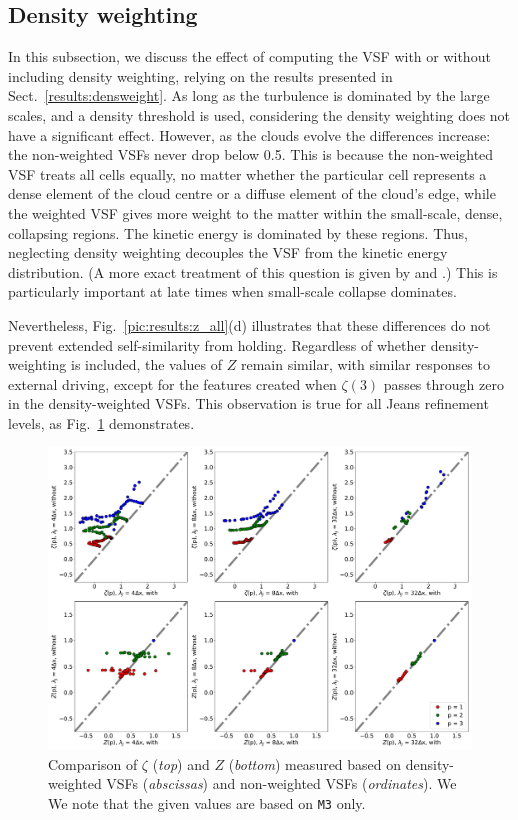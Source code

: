 \documentclass{aa}		%
\begin{document}
\subsection{Density weighting}\label{discussion:densweight}

In this subsection, we discuss the effect of computing the VSF with or without including density weighting, relying on the results presented in Sect.~\ref{results:densweight}.
As long as the turbulence is dominated by the large scales, and a density threshold is used, considering the density weighting does not have a significant effect.
However, as the clouds evolve the differences increase:
the non-weighted VSFs never drop below 0.5.
This is because the non-weighted VSF treats all cells equally, no matter whether the particular cell represents a dense element of the cloud centre or a diffuse element of the cloud's edge, while the weighted VSF gives more weight to the matter within the small-scale, dense, collapsing regions.
The kinetic energy is dominated by these regions.
Thus, neglecting density weighting decouples the VSF from the kinetic energy distribution.
(A more exact treatment of this question is given by \citet{Kritsuk2013a} and \citet{Banerjee2017,Banerjee2018}.)
This is particularly important at late times when small-scale collapse dominates.

Nevertheless, Fig.~\ref{pic:results:z_all}(d) illustrates that these differences do not prevent extended self-similarity from holding. 
Regardless of whether density-weighting is included, the values of $Z$ remain similar, with similar responses to external driving, except for the features created when $\zeta(3)$ passes through zero in the density-weighted VSFs.
This observation is true for all Jeans refinement levels, as Fig.~\ref{pic:results:comp_weighting} demonstrates.


\begin{figure}
	\centering
    \includegraphics[width=\textwidth]{comp_weighting.pdf}
    \caption{ Comparison of $\zeta$ (\textit{top}) and $Z$ (\textit{bottom}) measured based on density-weighted VSFs (\textit{abscissas}) and non-weighted VSFs (\textit{ordinates}). We We note that the given values are based on \texttt{M3} only.}
    \label{pic:results:comp_weighting}
\end{figure}
\end{document}
